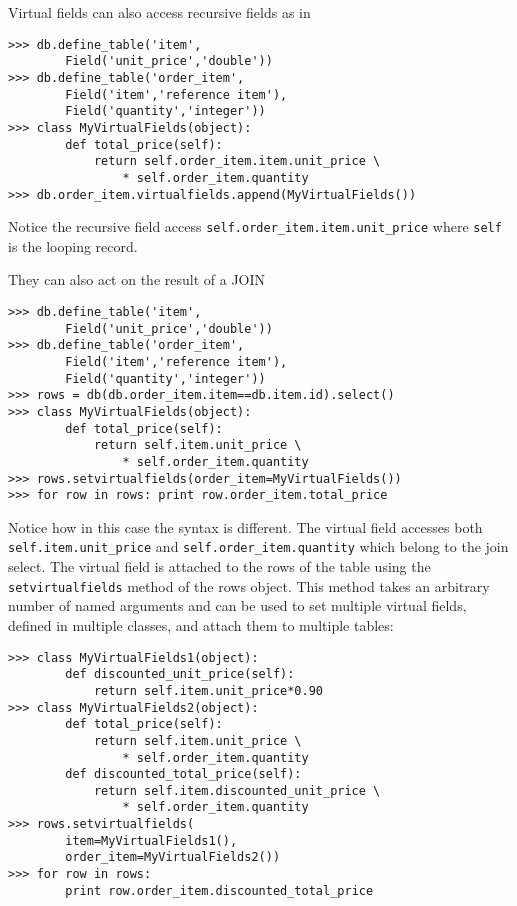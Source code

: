 \documentclass[justified,sixbynine,notoc]{tufte-book}
\def\ft{\small\tt}
\begin{document}
\begin{fullwidth}
Virtual fields can also access recursive fields as in
\begin{lstlisting}
>>> db.define_table('item',
        Field('unit_price','double'))
>>> db.define_table('order_item',
        Field('item','reference item'),
        Field('quantity','integer'))
>>> class MyVirtualFields(object):
        def total_price(self):
            return self.order_item.item.unit_price \
                * self.order_item.quantity
>>> db.order_item.virtualfields.append(MyVirtualFields())
\end{lstlisting}

Notice the recursive field access {\ft self.order\_item.item.unit\_price} where {\ft self} is the looping record.

They can also act on the result of a JOIN
\begin{lstlisting}
>>> db.define_table('item',
        Field('unit_price','double'))
>>> db.define_table('order_item',
        Field('item','reference item'),
        Field('quantity','integer'))
>>> rows = db(db.order_item.item==db.item.id).select()
>>> class MyVirtualFields(object):
        def total_price(self):
            return self.item.unit_price \
                * self.order_item.quantity
>>> rows.setvirtualfields(order_item=MyVirtualFields())
>>> for row in rows: print row.order_item.total_price
\end{lstlisting}

Notice how in this case the syntax is different. The virtual field accesses both {\ft self.item.unit\_price} and {\ft self.order\_item.quantity} which belong to the join select. The virtual field is attached to the rows of the table using the {\ft setvirtualfields} method of the rows object. This method takes an arbitrary number of named arguments and can be used to set multiple virtual fields, defined in multiple classes, and attach them to multiple tables:
\begin{lstlisting}
>>> class MyVirtualFields1(object):
        def discounted_unit_price(self):
            return self.item.unit_price*0.90
>>> class MyVirtualFields2(object):
        def total_price(self):
            return self.item.unit_price \
                * self.order_item.quantity
        def discounted_total_price(self):
            return self.item.discounted_unit_price \
                * self.order_item.quantity
>>> rows.setvirtualfields(
        item=MyVirtualFields1(),
        order_item=MyVirtualFields2())
>>> for row in rows:
        print row.order_item.discounted_total_price
\end{lstlisting}


\end{fullwidth}
\end{document}
